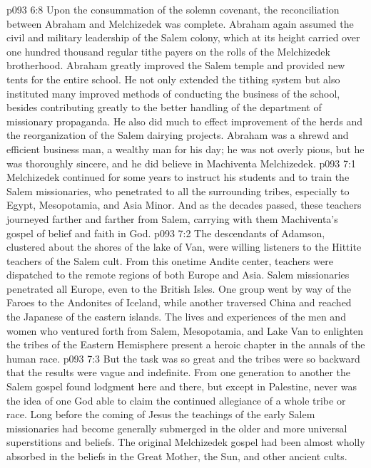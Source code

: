 \vs p093 6:8 Upon the consummation of the solemn covenant, the reconciliation between Abraham and Melchizedek was complete. Abraham again assumed the civil and military leadership of the Salem colony, which at its height carried over one hundred thousand regular tithe payers on the rolls of the Melchizedek brotherhood. Abraham greatly improved the Salem temple and provided new tents for the entire school. He not only extended the tithing system but also instituted many improved methods of conducting the business of the school, besides contributing greatly to the better handling of the department of missionary propaganda. He also did much to effect improvement of the herds and the reorganization of the Salem dairying projects. Abraham was a shrewd and efficient business man, a wealthy man for his day; he was not overly pious, but he was thoroughly sincere, and he did believe in Machiventa Melchizedek.
\vs p093 7:1 Melchizedek continued for some years to instruct his students and to train the Salem missionaries, who penetrated to all the surrounding tribes, especially to Egypt, Mesopotamia, and Asia Minor. And as the decades passed, these teachers journeyed farther and farther from Salem, carrying with them Machiventa’s gospel of belief and faith in God.
\vs p093 7:2 The descendants of Adamson, clustered about the shores of the lake of Van, were willing listeners to the Hittite teachers of the Salem cult. From this onetime Andite center, teachers were dispatched to the remote regions of both Europe and Asia. Salem missionaries penetrated all Europe, even to the British Isles. One group went by way of the Faroes to the Andonites of Iceland, while another traversed China and reached the Japanese of the eastern islands. The lives and experiences of the men and women who ventured forth from Salem, Mesopotamia, and Lake Van to enlighten the tribes of the Eastern Hemisphere present a heroic chapter in the annals of the human race.
\vs p093 7:3 But the task was so great and the tribes were so backward that the results were vague and indefinite. From one generation to another the Salem gospel found lodgment here and there, but except in Palestine, never was the idea of one God able to claim the continued allegiance of a whole tribe or race. Long before the coming of Jesus the teachings of the early Salem missionaries had become generally submerged in the older and more universal superstitions and beliefs. The original Melchizedek gospel had been almost wholly absorbed in the beliefs in the Great Mother, the Sun, and other ancient cults.
